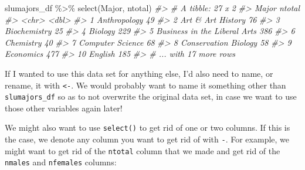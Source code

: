 \documentclass[
]{book}
\newenvironment{Shaded}{\begin{snugshade}}{\end{snugshade}}
\newcommand{\CommentTok}[1]{\textcolor[rgb]{0.56,0.35,0.01}{\textit{#1}}}
\newcommand{\FunctionTok}[1]{\textcolor[rgb]{0.00,0.00,0.00}{#1}}
\newcommand{\NormalTok}[1]{#1}
\newcommand{\SpecialCharTok}[1]{\textcolor[rgb]{0.00,0.00,0.00}{#1}}
\begin{document}
\begin{Shaded}
\begin{Highlighting}[]
\NormalTok{slumajors\_df }\SpecialCharTok{\%\textgreater{}\%} \FunctionTok{select}\NormalTok{(Major, ntotal)}
\CommentTok{\#\textgreater{} \# A tibble: 27 x 2}
\CommentTok{\#\textgreater{}    Major                        ntotal}
\CommentTok{\#\textgreater{}    \textless{}chr\textgreater{}                         \textless{}dbl\textgreater{}}
\CommentTok{\#\textgreater{}  1 Anthropology                     49}
\CommentTok{\#\textgreater{}  2 Art \& Art History                76}
\CommentTok{\#\textgreater{}  3 Biochemistry                     25}
\CommentTok{\#\textgreater{}  4 Biology                         229}
\CommentTok{\#\textgreater{}  5 Business in the Liberal Arts    386}
\CommentTok{\#\textgreater{}  6 Chemistry                        40}
\CommentTok{\#\textgreater{}  7 Computer Science                 68}
\CommentTok{\#\textgreater{}  8 Conservation Biology             58}
\CommentTok{\#\textgreater{}  9 Economics                       477}
\CommentTok{\#\textgreater{} 10 English                         185}
\CommentTok{\#\textgreater{} \# ... with 17 more rows}
\end{Highlighting}
\end{Shaded}

If I wanted to use this data set for anything else, I'd also need to name, or rename, it with \texttt{\textless{}-}. We would probably want to name it something other than \texttt{slumajors\_df} so as to not overwrite the original data set, in case we want to use those other variables again later!

We might also want to use \texttt{select()} to get rid of one or two columns. If this is the case, we denote any column you want to get rid of with \texttt{-}. For example, we might want to get rid of the \texttt{ntotal} column that we made and get rid of the \texttt{nmales} and \texttt{nfemales} columns:
\end{document}
